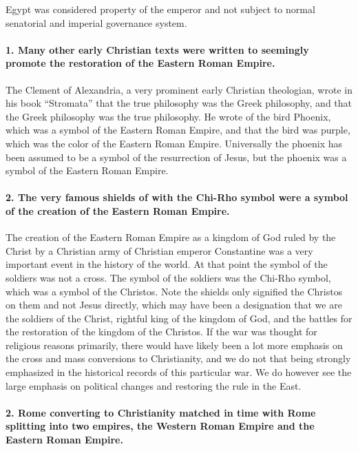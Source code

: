 Egypt was considered property of the emperor and not subject to normal senatorial and imperial governance system.

\paragraph{1.
Many other early Christian texts were written to seemingly promote the restoration of the Eastern Roman Empire.}\label{par:many-other-early-christian-texts-were-written-to-seemingly-promote-the-restoration-of-the-eastern-roman-empire.}

The Clement of Alexandria, a very prominent early Christian theologian, wrote in his book ``Stromata'' that the true philosophy was the Greek philosophy, and that the Greek philosophy was the true philosophy.
He wrote of the bird Phoenix, which was a symbol of the Eastern Roman Empire, and that the bird was purple, which was the color of the Eastern Roman Empire.
Universally the phoenix has been assumed to be a symbol of the resurrection of Jesus, but the phoenix was a symbol of the Eastern Roman Empire.

\paragraph{2.
The very famous shields of with the Chi-Rho symbol were a symbol of the creation of the Eastern Roman Empire.}\label{par:the-very-famous-shields-of-with-the-chi-rho-symbol-were-a-symbol-of-the-creation-of-the-eastern-roman-empire.}

The creation of the Eastern Roman Empire as a kingdom of God ruled by the Christ by a Christian army of Christian emperor Constantine was a very important event in the history of the world.
At that point the symbol of the soldiers was not a cross.
The symbol of the soldiers was the Chi-Rho symbol, which was a symbol of the Christos.
Note the shields only signified the Christos on them and not Jesus directly, which may have been a designation that we are the soldiers of the Christ, rightful king of the kingdom of God, and the battles for the restoration of the kingdom of the Christos.
If the war was thought for religious reasons primarily, there would have likely been a lot more emphasis on the cross and mass conversions to Christianity, and we do not that being strongly emphasized in the historical records of this particular war.
We do however see the large emphasis on political changes and restoring the rule in the East.

\paragraph{2.
Rome converting to Christianity matched in time with Rome splitting into two empires, the Western Roman Empire and the Eastern Roman Empire.}\label{par:rome-converting-to-christianity-matched-in-time-with-rome-splitting-into-two-empires-the-western-roman-empire-and-the-eastern-roman-empire.}

